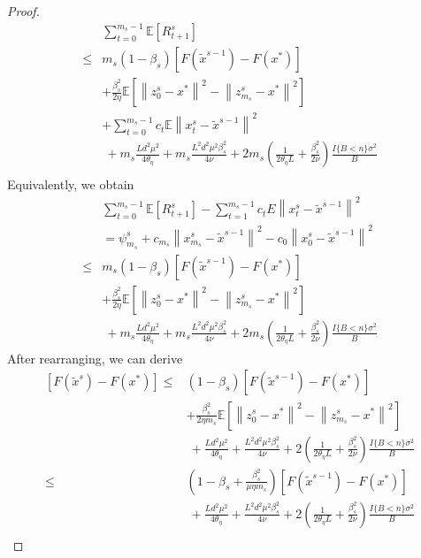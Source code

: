 \documentclass{article}
\newcommand*{\E}{\mathbb{E}}
\newcommand{\norm}[1]{\left\lVert#1\right\rVert}
\theoremstyle{definition}
\theoremstyle{remark}
\begin{document}
{\begin{proof}
\begin{equation}
\begin{split}
&\sum_{t=0}^{m_s-1} \E[R_{t+1}^s]\\
\leq &m_s(1-\beta_s)[F(\widetilde{x}^{s-1})-F(x^*)] \\
&+ {\frac{ \beta_s^2}{2\eta}}\E[\norm{z_{0}^s-x^*}^2-\norm{z_{m_s}^s-x^*}^2]\\
&+ \sum_{t=0}^{m_s-1} c_t\E\norm{x_t^s-\widetilde{x}^{s-1}}^2\\
&~+m_s\frac{Ld^2\mu^2}{4\theta_{\eta}}+m_s\frac{ L^2d^2\mu^2\beta_s^2}{4\nu}+2m_s(\frac{1}{2\theta_{\eta} L}+\frac{\beta_s^2}{2\nu})\frac{I\{B < n\} \sigma ^2}{B}\\
\end{split}
\end{equation}
Equivalently, we obtain
\begin{equation}
\begin{split}
&\sum_{t=0}^{m_s-1} \E[R_{t+1}^s]-\sum_{t=1}^{m_s-1}c_t E\norm{x_t^s-\widetilde{x}^{s-1}}^2\\
&= \psi_{m_s}^s+c_{m_s}\norm{x_{m_s}^s-\widetilde{x}^{s-1}}^2-c_{0}\norm{x_{0}^s-\widetilde{x}^{s-1}}^2\\
\leq &m_s(1-\beta_s)[F(\widetilde{x}^{s-1})-F(x^*)] \\
&+ {\frac{ \beta_s^2}{2\eta}}\E[\norm{z_{0}^s-x^*}^2-\norm{z_{m_s}^s-x^*}^2]\\
&~+m_s\frac{Ld^2\mu^2}{4\theta_{\eta}}+m_s\frac{ L^2d^2\mu^2\beta_s^2}{4\nu}+2m_s(\frac{1}{2\theta_{\eta} L}+\frac{\beta_s^2}{2\nu})\frac{I\{B < n\} \sigma ^2}{B}
\end{split}
\end{equation}
After rearranging, we can derive
\begin{equation}
\begin{split}
[F(\widetilde{x}^{s})-F(x^*)] \leq &(1-\beta_s)[F(\widetilde{x}^{s-1})-F(x^*)] \\
&+ {\frac{ \beta_s^2}{2\eta m_s}}\E[\norm{z_{0}^s-x^*}^2-\norm{z_{m_s}^s-x^*}^2]\\
&~+\frac{Ld^2\mu^2}{4\theta_{\eta}}+\frac{ L^2d^2\mu^2\beta_s^2}{4\nu}+2(\frac{1}{2\theta_{\eta} L}+\frac{\beta_s^2}{2\nu})\frac{I\{B < n\} \sigma ^2}{B}\\
\leq&(1-\beta_s+\frac{ \beta_s^2}{\mu\eta m_s})[F(\widetilde{x}^{s-1})-F(x^*)] \\
&~+\frac{Ld^2\mu^2}{4\theta_{\eta}}+\frac{ L^2d^2\mu^2\beta_s^2}{4\nu}+2(\frac{1}{2\theta_{\eta} L}+\frac{\beta_s^2}{2\nu})\frac{I\{B < n\} \sigma ^2}{B}\\

\end{split}
\end{equation}
\end{proof}}
\end{document}
